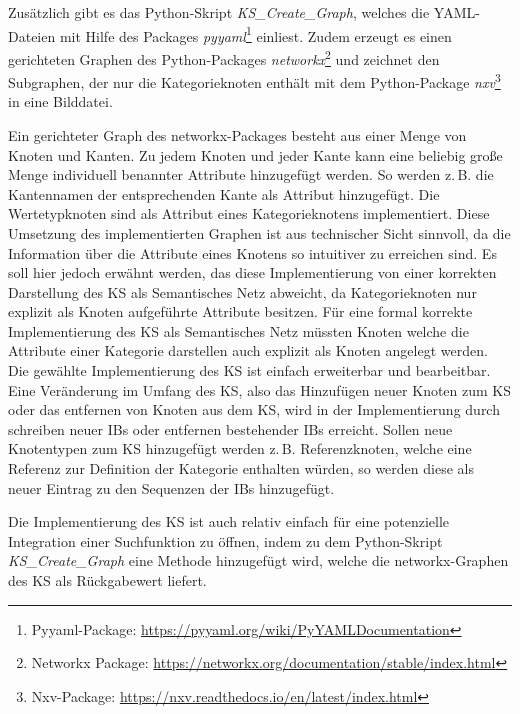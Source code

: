 Zusätzlich gibt es das Python-Skript \textit{KS\_Create\_Graph}, welches die YAML-Dateien mit Hilfe des Packages \textit{pyyaml}\footnote{Pyyaml-Package: \url{https://pyyaml.org/wiki/PyYAMLDocumentation}} einliest. Zudem erzeugt es einen gerichteten Graphen des Python-Packages \textit{networkx}\footnote{Networkx Package: \url{https://networkx.org/documentation/stable/index.html}} und zeichnet den Subgraphen, der nur die Kategorieknoten enthält mit dem Python-Package \textit{nxv}\footnote{Nxv-Package: \url{https://nxv.readthedocs.io/en/latest/index.html}} in eine Bilddatei.

Ein gerichteter Graph des networkx-Packages besteht aus einer Menge von Knoten und Kanten. Zu jedem Knoten und jeder Kante kann eine beliebig große Menge individuell benannter Attribute hinzugefügt werden. So werden z.\,B. die Kantennamen der entsprechenden Kante als Attribut hinzugefügt. Die Wertetypknoten sind als Attribut eines Kategorieknotens implementiert. Diese Umsetzung des implementierten Graphen ist aus technischer Sicht sinnvoll, da die Information über die Attribute eines Knotens so intuitiver zu erreichen sind. Es soll hier jedoch erwähnt werden, das diese Implementierung von einer korrekten Darstellung des KS als Semantisches Netz abweicht, da Kategorieknoten nur explizit als Knoten aufgeführte Attribute besitzen. Für eine formal korrekte Implementierung des KS als Semantisches Netz müssten Knoten welche die Attribute einer Kategorie darstellen auch explizit als Knoten angelegt werden.\\
Die gewählte Implementierung des KS ist einfach erweiterbar und bearbeitbar. Eine Veränderung im Umfang des KS, also das Hinzufügen neuer Knoten zum KS oder das entfernen von Knoten aus dem KS, wird in der Implementierung durch schreiben neuer IB\grq s oder entfernen bestehender IB\grq s erreicht. Sollen neue Knotentypen zum KS hinzugefügt werden z.\,B. Referenzknoten, welche eine Referenz zur Definition der Kategorie enthalten würden, so werden diese als neuer Eintrag zu den Sequenzen der IB\grq s hinzugefügt.

Die Implementierung des KS ist auch relativ einfach für eine potenzielle Integration einer Suchfunktion zu öffnen, indem zu dem Python-Skript \textit{KS\_Create\_Graph} eine Methode hinzugefügt wird, welche die networkx-Graphen des KS als Rückgabewert liefert.  


